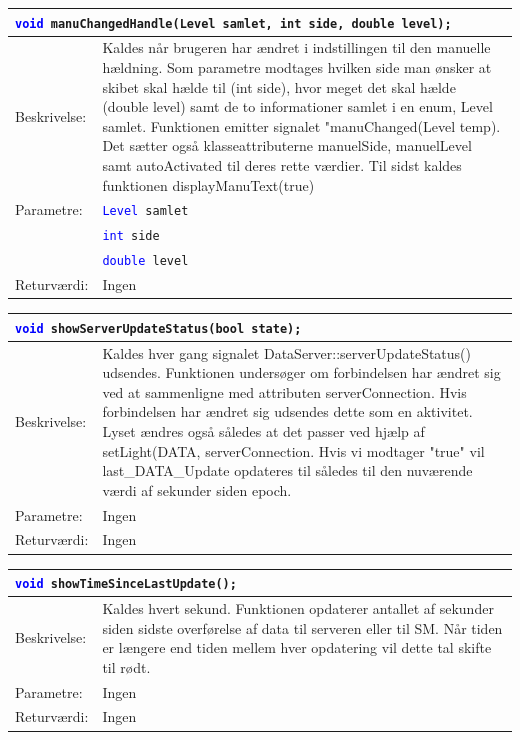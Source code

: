 \begin{table}[H]
\begin{tabular}{l p{12.5cm}}
\multicolumn{2}{l}{\texttt{\textcolor{blue}{void} manuChangedHandle(Level samlet, int side, double level);}} \\
\hline
Beskrivelse:& Kaldes når brugeren har ændret i indstillingen til den manuelle hældning. Som parametre modtages hvilken side man ønsker at skibet skal hælde til (int side), hvor meget det skal hælde (double level) samt de to informationer samlet i en enum, Level samlet.
Funktionen emitter signalet "manuChanged(Level temp). Det sætter også klasseattributerne manuelSide, manuelLevel samt autoActivated til deres rette værdier.
Til sidst kaldes funktionen displayManuText(true)\\   
Parametre:&\texttt{\textcolor{blue}{Level} samlet}\\
&\texttt{\textcolor{blue}{int} side}\\
&\texttt{\textcolor{blue}{double} level}\\
Returværdi:&Ingen\\
\end{tabular}
\end{table}


\begin{table}[H]
\begin{tabular}{l p{12.5cm}}
\multicolumn{2}{l}{\texttt{\textcolor{blue}{void} showServerUpdateStatus(bool state);}} \\
\hline
Beskrivelse:&Kaldes hver gang signalet DataServer::serverUpdateStatus() udsendes. Funktionen undersøger om forbindelsen har ændret sig ved at sammenligne med attributen serverConnection.
Hvis forbindelsen har ændret sig udsendes dette som en aktivitet. Lyset ændres også således at det passer ved hjælp af setLight(DATA, serverConnection. Hvis vi modtager "true" vil last\_DATA\_Update opdateres til således til den nuværende værdi af sekunder siden epoch.\\   
Parametre:&Ingen\\
Returværdi:&Ingen\\
\end{tabular}
\end{table}


\begin{table}[H]
\begin{tabular}{l p{12.5cm}}
\multicolumn{2}{l}{\texttt{\textcolor{blue}{void} showTimeSinceLastUpdate();}} \\
\hline
Beskrivelse:&Kaldes hvert sekund. Funktionen opdaterer antallet af sekunder siden sidste overførelse af data til serveren eller til SM. Når tiden er længere end tiden mellem hver opdatering vil dette tal skifte til rødt.\\    
Parametre:&Ingen\\
Returværdi:&Ingen\\
\end{tabular}
\end{table}


